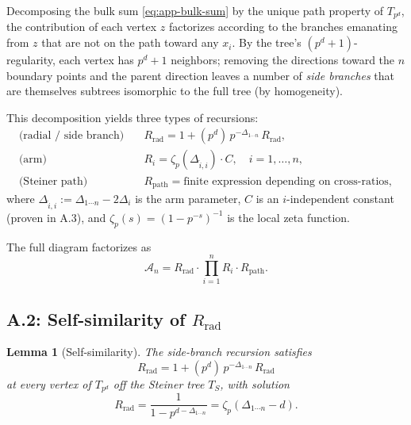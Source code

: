 \documentclass[11pt,a4paper]{article}
\newtheorem{lemma}{Lemma}
\begin{document}
Decomposing the bulk sum \eqref{eq:app-bulk-sum} by the unique path property of $T_{p^d}$, the contribution of each vertex $z$ factorizes according to the branches emanating from $z$ that are not on the path toward any $x_i$. By the tree's $(p^d{+}1)$-regularity, each vertex has $p^d{+}1$ neighbors; removing the directions toward the $n$ boundary points and the parent direction leaves a number of \emph{side branches} that are themselves subtrees isomorphic to the full tree (by homogeneity).

This decomposition yields three types of recursions:
\begin{align}
\text{(radial / side branch)}\quad & R_{\mathrm{rad}} = 1 + (p^d) \, p^{-\Delta_{1\cdots n}} \, R_{\mathrm{rad}}, \label{eq:rec-rad}\\
\text{(arm)}\quad & R_i = \zeta_p(\Delta_{\hat{i},i}) \cdot C, \quad i = 1, \ldots, n, \label{eq:rec-arm}\\
\text{(Steiner path)}\quad & R_{\mathrm{path}} = \text{finite expression depending on cross-ratios}, \label{eq:rec-path}
\end{align}
where $\Delta_{\hat{i},i} := \Delta_{1\cdots n} - 2\Delta_i$ is the arm parameter, $C$ is an $i$-independent constant (proven in A.3), and $\zeta_p(s) = (1 - p^{-s})^{-1}$ is the local zeta function.

The full diagram factorizes as
\begin{equation}
\label{eq:factorization}
\mathcal{A}_n = R_{\mathrm{rad}} \cdot \prod_{i=1}^n R_i \cdot R_{\mathrm{path}}.
\end{equation}

\subsection{A.2: Self-similarity of $R_{\mathrm{rad}}$}

\begin{lemma}[Self-similarity]
\label{lem:self-sim}
The side-branch recursion satisfies
\begin{equation}
R_{\mathrm{rad}} = 1 + (p^d) \, p^{-\Delta_{1\cdots n}} \, R_{\mathrm{rad}}
\end{equation}
at every vertex of $T_{p^d}$ off the Steiner tree $T_S$, with solution
\begin{equation}
R_{\mathrm{rad}} = \frac{1}{1 - p^{d - \Delta_{1\cdots n}}} = \zeta_p(\Delta_{1\cdots n} - d).
\end{equation}
\end{lemma}
\end{document}
